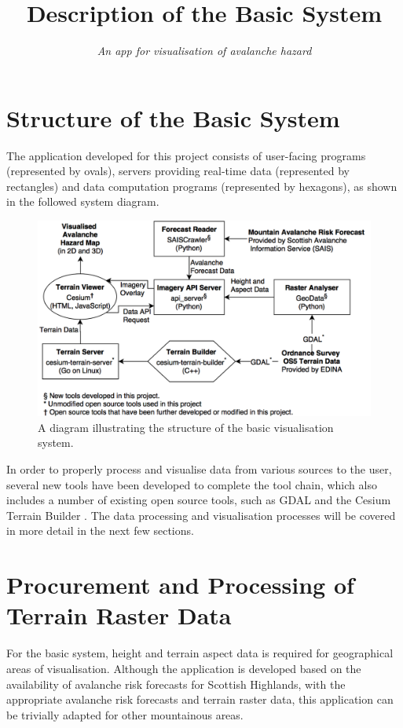 \documentclass[11pt, oneside]{article}
\title{\vspace{-1.6cm}Description of the Basic System}
\author{\textit{An app for visualisation of avalanche hazard}}
\date{}
\begin{document}
\maketitle

\section{Structure of the Basic System}

The application developed for this project consists of user-facing programs (represented by ovals), servers providing real-time data (represented by rectangles) and data computation programs (represented by hexagons), as shown in the followed system diagram.

\begin{figure}[h]
\centering
\includegraphics[scale=0.3]{System.png}
\caption{A diagram illustrating the structure of the basic visualisation system.}
\end{figure}

In order to properly process and visualise data from various sources to the user, several new tools have been developed to complete the tool chain, which also includes a number of existing open source tools, such as GDAL\cite{GDAL} and the Cesium Terrain Builder \cite{cesium-terrain-builder}. The data processing and visualisation processes will be covered in more detail in the next few sections.

\section{Procurement and Processing of Terrain Raster Data}
	For the basic system, height and terrain aspect data is required for geographical areas of visualisation. Although the application is developed based on the availability of avalanche risk forecasts for Scottish Highlands, with the appropriate avalanche risk forecasts and terrain raster data, this application can be trivially adapted for other mountainous areas.
	
\end{document}
